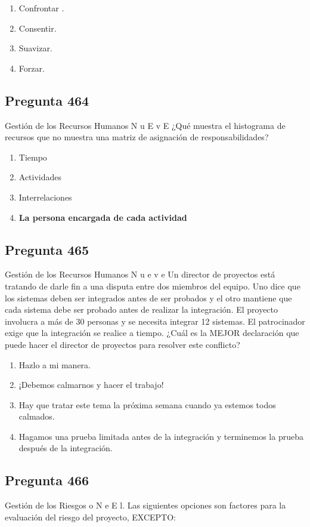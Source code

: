 \documentclass[11pt,a4paper]{article}
\begin{document}
\begin{enumerate}[label=\alph*)]
  \item Confrontar .
  \item Consentir.
  \item Suavizar.
  \item Forzar.
\end{enumerate}

\subsection*{Pregunta 464}
Gestión de los Recursos Humanos N u E v E ¿Qué muestra el histograma de recursos que no muestra una matriz de asignación de responsabilidades?

\begin{enumerate}[label=\alph*)]
  \item Tiempo
  \item Actividades
  \item Interrelaciones
  \item \textbf{La persona encargada de cada actividad}
\end{enumerate}

\subsection*{Pregunta 465}
Gestión de los Recursos Humanos N u e v e Un director de proyectos está tratando de darle fin a una disputa entre dos miembros del equipo. Uno dice que los sistemas deben ser integrados antes de ser probados y el otro mantiene que cada sistema debe ser probado antes de realizar la integración. El proyecto involucra a más de 30 personas y se necesita integrar 12 sistemas. El patrocinador exige que la integración se realice a tiempo. ¿Cuál es la MEJOR declaración que puede hacer el director de proyectos para resolver este conflicto?

\begin{enumerate}[label=\alph*)]
  \item Hazlo a mi manera.
  \item ¡Debemos calmarnos y hacer el trabajo!
  \item Hay que tratar este tema la próxima semana cuando ya estemos todos calmados.
  \item Hagamos una prueba limitada antes de la integración y terminemos la prueba después de la integración.
\end{enumerate}

\subsection*{Pregunta 466}
Gestión de los Riesgos o N e E l. Las siguientes opciones son factores para la evaluación del riesgo del proyecto, EXCEPTO:
\end{document}
